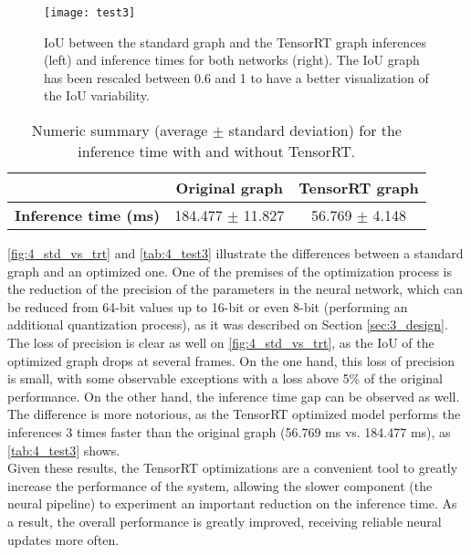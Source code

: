 \begin{figure}[h]
	\centering
	\texttt{[image: test3]}
	\caption{IoU between the standard graph and the TensorRT graph inferences (left) and inference times for both networks (right). The IoU graph has been rescaled between 0.6 and 1 to have a better visualization of the IoU variability.}
	\label{fig:4_std_vs_trt}
\end{figure}


\begin{table}[h]
	\begin{tabular}{|l|c|c|}
		\hline
		& \textbf{Original graph} & \textbf{TensorRT graph} \\ \hline
		\textbf{Inference time (ms)}           & 184.477 $\pm$  11.827 & 56.769 $\pm$  4.148 \\ \hline
	\end{tabular}
	\caption{Numeric summary (average $\pm$ standard deviation) for the inference time with and without TensorRT.}
	\label{tab:4_test3}
\end{table}


\autoref{fig:4_std_vs_trt} and \autoref{tab:4_test3} illustrate the differences between a standard graph and an optimized one. One of the premises of the optimization process is the reduction of the precision of the parameters in the neural network, which can be reduced from 64-bit values up to 16-bit or even 8-bit (performing an additional quantization process), as it was described on Section \ref{sec:3_design}.\\

The loss of precision is clear as well on \autoref{fig:4_std_vs_trt}, as the IoU of the optimized graph drops at several frames. On the one hand, this loss of precision is small, with some observable exceptions with a loss above 5\% of the original performance. On the other hand, the inference time gap can be observed as well. The difference is more notorious, as the TensorRT optimized model performs the inferences 3 times faster than the original graph (56.769 ms vs. 184.477 ms), as \autoref{tab:4_test3} shows.\\

Given these results, the TensorRT optimizations are a convenient tool to greatly increase the performance of the system, allowing the slower component (the neural pipeline) to experiment an important reduction on the inference time. As a result, the overall performance is greatly improved, receiving reliable neural updates more often.\\

